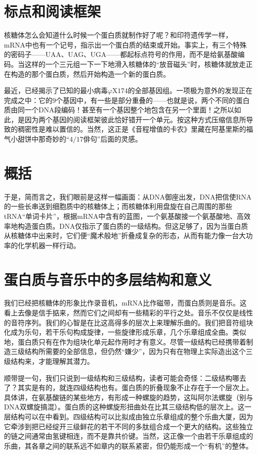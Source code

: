 \section{标点和阅读框架}

核糖体怎么会知道什么时候一个蛋白质就制作好了呢？和印符遗传学一样，mRNA中也有一个记号，指示出一个蛋白质的结束或开始。事实上，有三个特殊的密码子——UAA、UAG、UGA——都起标点符号的作用，而不是给氨基酸编码。当这样的一个三元组一下一下地滑入核糖体的“放音磁头”时，核糖体就放走正在构造的那个蛋白质，然后开始构造一个新的蛋白质。

最近，已经揭示了已知的最小病毒$\varphi\mathrm{X}174$的全部基因组。一项极为意外的发现正在完成之中：它的$9$个基因中，有一些是部分重叠的——也就是说，两个不同的蛋白质由同一个DNA段编码！甚至有一个基因整个地包含在另一个里面！之所以如此，是因为两个基因的阅读框架彼此恰好错开一个单元。按这种方式压缩信息所导致的稠密性是难以置信的。当然，这正是《音程增值的卡农》里藏在阿基里斯的福气小甜饼中那奇妙的“$4/17$俳句”后面的灵感。

\section{概括}

于是，简而言之，我们眼前是这样一幅画面：从DNA御座出发，DNA把信使RNA的一些长串送到细胞质中的核糖体上；而核糖体利用盘旋在自己周围的那些tRNA“单词卡片”，根据mRNA中含有的蓝图，一个氨基酸接一个氨基酸地、高效率地构造蛋白质。DNA仅指示了蛋白质的一级结构。但这足够了，因为当蛋白质从核糖体中出来时，它们便“魔术般地”折叠成复杂的形态，从而有能力像一台大功率的化学机器一样行动。

\section{蛋白质与音乐中的多层结构和意义}

我们已经把核糖体的形象比作录音机，mRNA比作磁带，而蛋白质则是音乐。这看上去像是信手掂来，然而它们之间却有一些精彩的平行之处。音乐不仅仅是线性的音符序列。我们的心智是在比这高得多的层次上来理解乐曲的。我们把音符组块化成为乐句，若干乐句构成旋律，一些旋律形成乐章，几个乐章组成全曲。类似地，蛋白质只有在作为组块化单元起作用时才有意义。尽管一级结构已经携带着制造三级结构所需要的全部信息，但仍然“嫌少”，因为只有在物理上实际造出这个三级结构来，才能理解其潜力。

顺带提一句，我们只说到一级结构和三级结构，读者可能会奇怪：二级结构哪去了？其实是有的，就连四级结构也有。蛋白质的折叠现象不止存在于一个层次上。具体讲，在氨基酸链的某些地方，有形成一种螺旋的趋势，这叫阿尔法螺旋（别与DNA双螺旋搞混）。蛋白质的这种螺旋形扭曲处在比其三级结构低的层次上。这一层结构可以在中看到。四级结构可以比拟成由独立乐章组成的整个乐曲大厦，因为它牵涉到把已经绽开三级鲜花的若干不同的多肽组合成一个更大的结构。这些独立的链之间通常由氢键相连，而不是靠共价键。当然，这正像一个由若干乐章组成的乐曲，其各章之间的联系远不如章内的联系紧密，但仍能形成一个“有机”的整体。

